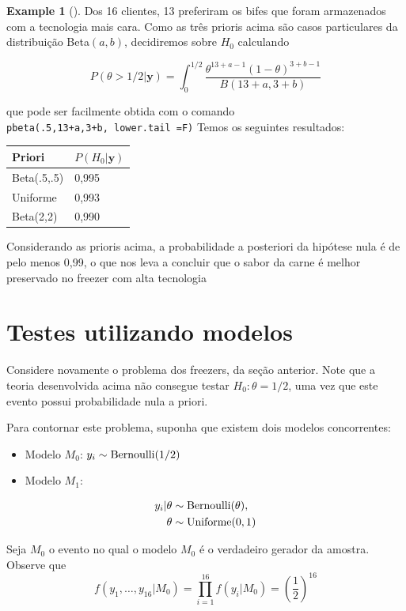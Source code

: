 \documentclass[
  letterpaper,
  DIV=11,
  numbers=noendperiod]{scrreprt}
\theoremstyle{definition}
\theoremstyle{plain}
\theoremstyle{definition}
\newtheorem{example}{Example}[chapter]
\theoremstyle{remark}
\begin{document}
\begin{example}[]
Dos 16 clientes, 13 preferiram os bifes que foram armazenados com a
tecnologia mais cara. Como as três prioris acima são casos particulares
da distribuição Beta\((a,b)\), decidiremos sobre \(H_0\) calculando

\[P(\theta>1/2|\textbf{y})=\int_0^{1/2}\frac{\theta^{13+a-1}(1-\theta)^{3+b-1}}{B(13+a,3+b)}\]

que pode ser facilmente obtida com o comando
\texttt{pbeta(.5,13+a,3+b,\ lower.tail\ =F)} Temos os seguintes
resultados:

\begin{longtable}[]{@{}ll@{}}
\toprule\noalign{}
Priori & \(P(H_0|\textbf{y})\) \\
\midrule\noalign{}
\endhead
\bottomrule\noalign{}
\endlastfoot
Beta(.5,.5) & 0,995 \\
Uniforme & 0,993 \\
Beta(2,2) & 0,990 \\
\end{longtable}

Considerando as prioris acima, a probabilidade a posteriori da hipótese
nula é de pelo menos 0,99, o que nos leva a concluir que o sabor da
carne é melhor preservado no freezer com alta tecnologia

\section{Testes utilizando modelos}\label{testes-utilizando-modelos}

Considere novamente o problema dos freezers, da seção anterior. Note que
a teoria desenvolvida acima não consegue testar \(H_0:\theta=1/2\), uma
vez que este evento possui probabilidade nula a priori.

Para contornar este problema, suponha que existem dois modelos
concorrentes:

\begin{itemize}
\item
  Modelo \(M_0\): \(y_i\sim\hbox{Bernoulli}(1/2)\)
\item
  Modelo \(M_1:\)
\end{itemize}

\[\begin{align}
y_i|\theta&\sim\hbox{Bernoulli}(\theta),\\
\theta&\sim\hbox{Uniforme}(0,1)\end{align}\]

Seja \(M_0\) o evento no qual o modelo \(M_0\) é o verdadeiro gerador da
amostra. Observe que
\[f(y_1,\ldots,y_{16}|M_0)=\prod_{i=1}^{16}f(y_i|M_0)=\left(\frac{1}{2}\right)^{16}\]


\end{example}
\end{document}
